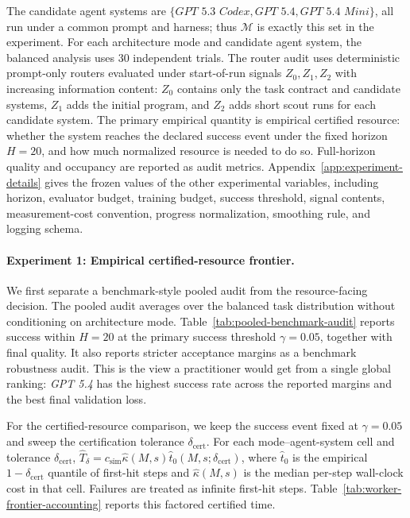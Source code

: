 \documentclass{article}
\newcommand{\cM}{\mathcal{M}}
\begin{document}
The candidate agent systems are \(\{\textit{GPT 5.3 Codex},\textit{GPT 5.4},\textit{GPT 5.4 Mini}\}\), all run under a common prompt and harness; thus \(\cM\) is exactly this set in the experiment.
For each architecture mode and candidate agent system, the balanced analysis uses 30 independent trials.
The router audit uses deterministic prompt-only routers evaluated under start-of-run signals \(Z_0,Z_1,Z_2\) with increasing information content: \(Z_0\) contains only the task contract and candidate systems, \(Z_1\) adds the initial program, and \(Z_2\) adds short scout runs for each candidate system.
The primary empirical quantity is empirical certified resource: whether the system reaches the declared success event under the fixed horizon \(H=20\), and how much normalized resource is needed to do so.  Full-horizon quality and occupancy are reported as audit metrics.
Appendix~\ref{app:experiment-details} gives the frozen values of the other experimental variables, including horizon, evaluator budget, training budget, success threshold, signal contents, measurement-cost convention, progress normalization, smoothing rule, and logging schema.

\paragraph{Experiment 1: Empirical certified-resource frontier.}

We first separate a benchmark-style pooled audit from the resource-facing decision.
The pooled audit averages over the balanced task distribution without conditioning on architecture mode.
Table~\ref{tab:pooled-benchmark-audit} reports success within \(H=20\) at the primary success threshold \(\gamma=0.05\), together with final quality.
It also reports stricter acceptance margins as a benchmark robustness audit.
This is the view a practitioner would get from a single global ranking: \textit{GPT 5.4} has the highest success rate across the reported margins and the best final validation loss.

For the certified-resource comparison, we keep the success event fixed at \(\gamma=0.05\) and sweep the certification tolerance \(\delta_{\mathrm{cert}}\).
For each mode--agent-system cell and tolerance \(\delta_{\mathrm{cert}}\), \(\widehat T_{\delta}=c_{\mathrm{sim}}\widehat\kappa(M,s)\widehat t_0(M,s;\delta_{\mathrm{cert}})\), where \(\widehat t_0\) is the empirical \(1-\delta_{\mathrm{cert}}\) quantile of first-hit steps and \(\widehat\kappa(M,s)\) is the median per-step wall-clock cost in that cell.
Failures are treated as infinite first-hit steps.
Table~\ref{tab:worker-frontier-accounting} reports this factored certified time.
\end{document}
